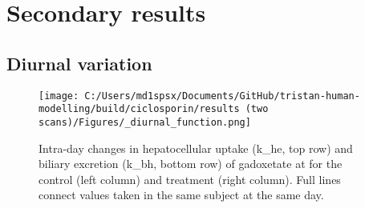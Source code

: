 \documentclass{epflreport}%
\begin{document}
\chapter{Secondary results}%
\section{Diurnal variation}%
\label{sec:Diurnalvariation}%

%


\begin{figure}[h!]%
\centering%
\texttt{[image: C:/Users/md1spsx/Documents/GitHub/tristan-human-modelling/build/ciclosporin/results (two scans)/Figures/\_diurnal\_function.png]}%
\caption{Intra{-}day changes in hepatocellular uptake (k\_he, top row) and biliary excretion (k\_bh, bottom row) of gadoxetate at for the control (left column) and treatment (right column). Full lines connect values taken in the same subject at the same day.}%
\end{figure}

%
\end{document}
